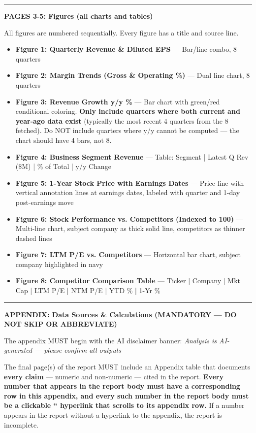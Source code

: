 \documentclass[11pt]{article}
\begin{document}
\vspace{0.5em}\hrule\vspace{0.5em}

\textbf{PAGES 3-5: Figures (all charts and tables)}


All figures are numbered sequentially. Every figure has a title and source line.


\begin{itemize}[leftmargin=*,itemsep=2pt,topsep=2pt]
\item {} \textbf{Figure 1: Quarterly Revenue \& Diluted EPS} — Bar/line combo, 8 quarters
\item {} \textbf{Figure 2: Margin Trends (Gross \& Operating \%)} — Dual line chart, 8 quarters
\item {} \textbf{Figure 3: Revenue Growth y/y \%} — Bar chart with green/red conditional coloring. \textbf{Only include quarters where both current and year-ago data exist} (typically the most recent 4 quarters from the 8 fetched). Do NOT include quarters where y/y cannot be computed — the chart should have 4 bars, not 8.
\item {} \textbf{Figure 4: Business Segment Revenue} — Table: Segment | Latest Q Rev (\$M) | \% of Total | y/y Change
\item {} \textbf{Figure 5: 1-Year Stock Price with Earnings Dates} — Price line with vertical annotation lines at earnings dates, labeled with quarter and 1-day post-earnings move
\item {} \textbf{Figure 6: Stock Performance vs. Competitors (Indexed to 100)} — Multi-line chart, subject company as thick solid line, competitors as thinner dashed lines
\item {} \textbf{Figure 7: LTM P/E vs. Competitors} — Horizontal bar chart, subject company highlighted in navy
\item {} \textbf{Figure 8: Competitor Comparison Table} — Ticker | Company | Mkt Cap | LTM P/E | NTM P/E | YTD \% | 1-Yr \%
\end{itemize}

\vspace{0.5em}\hrule\vspace{0.5em}

\textbf{APPENDIX: Data Sources \& Calculations (MANDATORY — DO NOT SKIP OR ABBREVIATE)}


The appendix MUST begin with the AI disclaimer banner: \emph{Analysis is AI-generated — please confirm all outputs}


The final page(s) of the report MUST include an Appendix table that documents \textbf{every claim} — numeric and non-numeric — cited in the report. \textbf{Every number that appears in the report body must have a corresponding row in this appendix, and every such number in the report body must be a clickable `` hyperlink that scrolls to its appendix row.} If a number appears in the report without a hyperlink to the appendix, the report is incomplete.
\end{document}
